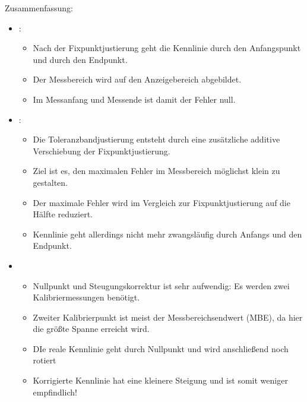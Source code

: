 \documentclass[letterpaper,10pt,english]{jupyterBook}
\begin{document}
\sphinxAtStartPar
Zusammenfassung:
\begin{itemize}
\item {} 
\sphinxAtStartPar
{}:
\begin{itemize}
\item {} 
\sphinxAtStartPar
Nach der Fixpunktjustierung geht die Kennlinie durch den Anfangspunkt und durch den Endpunkt.

\item {} 
\sphinxAtStartPar
Der Messbereich wird auf den Anzeigebereich abgebildet.

\item {} 
\sphinxAtStartPar
Im Messanfang und Messende ist damit der Fehler null.

\end{itemize}

\item {} 
\sphinxAtStartPar
{}:
\begin{itemize}
\item {} 
\sphinxAtStartPar
Die Toleranzbandjustierung entsteht durch eine zusätzliche additive Verschiebung der Fixpunktjustierung.

\item {} 
\sphinxAtStartPar
Ziel ist es, den maximalen Fehler im Messbereich möglichst klein zu gestalten.

\item {} 
\sphinxAtStartPar
Der maximale Fehler wird im Vergleich zur Fixpunktjustierung auf die Hälfte reduziert.

\item {} 
\sphinxAtStartPar
Kennlinie geht allerdings nicht mehr zwangsläufig durch Anfangs\sphinxhyphen{} und den Endpunkt.

\end{itemize}

\item {} 
\sphinxAtStartPar
{}
\begin{itemize}
\item {} 
\sphinxAtStartPar
Nullpunkt und Steugungskorrektur ist sehr aufwendig: Es werden zwei Kalibriermessungen benötigt.

\item {} 
\sphinxAtStartPar
Zweiter Kalibrierpunkt ist meist der Messbereichsendwert (MBE), da hier die größte Spanne erreicht wird.

\item {} 
\sphinxAtStartPar
DIe reale Kennlinie geht durch Nullpunkt und wird anschließend noch rotiert

\item {} 
\sphinxAtStartPar
Korrigierte Kennlinie hat eine kleinere Steigung und ist somit weniger empfindlich!

\end{itemize}

\end{itemize}
\end{document}
